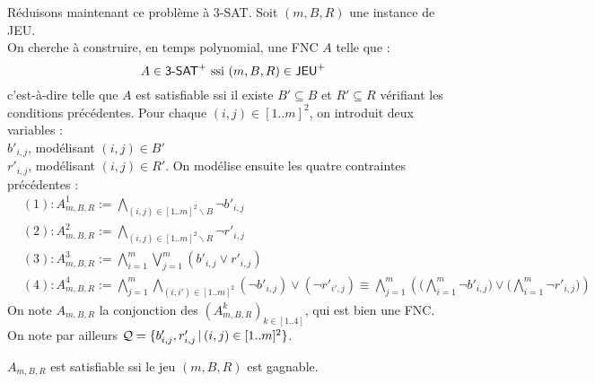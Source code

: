 			Réduisons maintenant ce problème à \textsf{3-SAT}. Soit \((m,B,R)\) une instance de \textsf{JEU}. \\
			On cherche à construire, en temps polynomial, une FNC \(A\) telle que :
				\[
					A\in \text{\textsf{3-SAT}}^+ \text{ ssi } (m,B,R) \in \text{\textsf{JEU}}^+
				\]
			c'est-à-dire telle que \(A\) est satisfiable ssi il existe \(B'\subseteq B\) et \(R'\subseteq R\) vérifiant les conditions précédentes. \nll
			Pour chaque \((i,j)\in[1..m]^2\), on introduit deux variables : \\
				 \bdot \(b'_{i,j}\), modélisant \((i,j)\in B'\) \\
				 \bdot \(r'_{i,j}\), modélisant \((i,j)\in R'\). \nt
			On modélise ensuite les quatre contraintes précédentes :
				\begin{align*}
					& (1) : A^1_{m,B,R} := \bigwedge_{(i,j)\in[1..m]^2\backslash B} \neg b'_{i,j} \\
					& (2) : A^2_{m,B,R} := \bigwedge_{(i,j)\in[1..m]^2\backslash R} \neg r'_{i,j} \\
					& (3) : A^3_{m,B,R} := \bigwedge_{i=1}^m \bigvee_{j=1}^m (b'_{i,j} \vee r'_{i,j}) \\
					& (4) : A^4_{m,B,R} := \bigwedge_{j=1}^m \bigwedge_{(i,i')\in[1..m]^2} (\neg b'_{i,j}) \vee (\neg r'_{i',j}) \equiv \bigwedge_{j=1}^m \left( \!\bigg(\bigwedge_{i=1}^m \neg b'_{i,j} \bigg) \vee \bigg(\bigwedge_{i=1}^m \neg r'_{i,j}\bigg)\!\right)
				\end{align*}
			On note \(A_{m,B,R}\) la conjonction des \((A^k_{m,B,R})_{k\in[1..4]}\), qui est bien une FNC. \\
			On note par ailleurs \(\cal{Q} = \{b'_{i,j},r'_{i,j}\,|\, (i,j)\in[1..m]^2\}\).
			
			\begin{Propriete}
				\(A_{m,B,R}\) est satisfiable ssi le jeu \((m,B,R)\) est gagnable.
			\end{Propriete}
			
